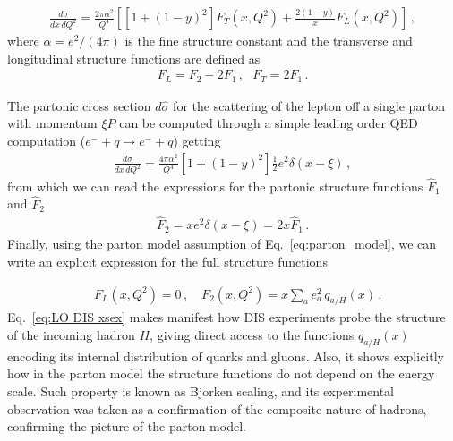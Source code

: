 \begin{align}
    \label{general cross xsec DIS}
    \frac{d\sigma}{dx\, dQ^2} = \frac{2\pi \alpha^2}{Q^4}\left[\left[1+\left(1-y\right)^2\right]F_T\left(x,Q^2\right) 
    +\frac{2\left(1-y\right)}{x}F_L\left(x,Q^2\right)\right]\,,
\end{align}
where $\alpha = e^2/\left(4\pi\right)$ is the fine structure constant and the transverse and longitudinal structure functions 
are defined as
\begin{align}
    F_L = F_2 -2F_1\,, \,\,\,\, F_T = 2F_1\,.
\end{align}

%
The partonic cross section $d\hat{\sigma}$ for the scattering of the lepton off a single parton with momentum $\xi P$
can be computed through a simple leading order QED computation ($e^- + q \rightarrow e^- + q $) getting
\begin{align}
    \frac{d\hat{\sigma}}{dx\, dQ^2} = 
    \frac{4\pi \alpha^2}{Q^4}\left[1+\left(1-y\right)^2\right]\frac{1}{2} e^2\delta\left(x-\xi\right)\,,
\end{align}
from which we can read the expressions for the partonic structure functions 
$\hat{F}_1$ and $\hat{F}_2$
\begin{align}
    \hat{F}_2 = x e^2 \delta\left(x-\xi\right) = 2x \hat{F}_1\,.
\end{align}
%
Finally, using the parton model assumption of Eq.~\eqref{eq:parton_model}, we can write
an explicit expression for the full structure functions

\begin{align}
    \label{eq:LO DIS xsex}
    &F_L\left(x,Q^2\right) = 0\,,\,\,\,\,\,\, 
    F_2\left(x,Q^2\right) = x\sum_a e_a^2\, q_{a/H}\left(x\right)\,. 
\end{align} 
Eq.~\eqref{eq:LO DIS xsex} makes manifest how DIS experiments probe the structure of the incoming hadron $H$,
giving direct access to the functions $q_{a/H}\left(x\right) $ encoding its internal distribution of quarks and gluons.
Also, it shows explicitly how in the parton model the structure functions do not depend on the energy scale.
Such property is known as Bjorken scaling, and its experimental observation was taken as a confirmation
of the composite nature of hadrons, confirming the picture of the parton model.

